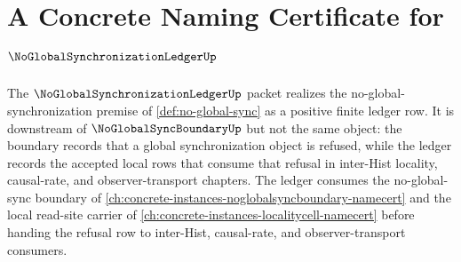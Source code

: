 \chapter{A Concrete Naming Certificate for $\NoGlobalSynchronizationLedgerUp$}
\label{ch:concrete-instances-no-global-synchronization-ledger-namecert}

The $\NoGlobalSynchronizationLedgerUp$ packet realizes the no-global-synchronization premise of \autoref{def:no-global-sync} as a positive finite ledger row. It is downstream of $\NoGlobalSyncBoundaryUp$ but not the same object: the boundary records that a global synchronization object is refused, while the ledger records the accepted local rows that consume that refusal in inter-Hist locality, causal-rate, and observer-transport chapters. The ledger consumes the no-global-sync boundary of \autoref{ch:concrete-instances-noglobalsyncboundary-namecert} and the local read-site carrier of \autoref{ch:concrete-instances-localitycell-namecert} before handing the refusal row to inter-Hist, causal-rate, and observer-transport consumers.



